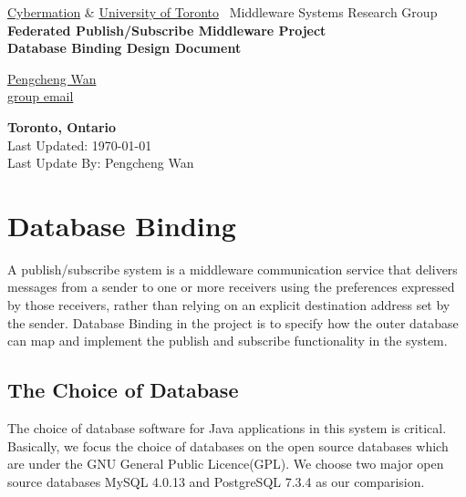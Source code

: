 \documentclass[11pt]{article}
\begin{document}
	
\pagestyle{plain}

\begin{titlepage}			%
\begin{center}

\vspace*{1in}
\Large
\textsf{\href{http://www.cybermation.com}{Cybermation} \& \href{http://www.ece.toronto.edu}{University of Toronto} \ Middleware Systems Research Group} \\
\vfill
\LARGE
\textsf{\textbf{Federated Publish/Subscribe Middleware Project}} \\
\bigskip
\huge
\textbf{Database Binding Design Document}

\vfill \vfill

\large

\href{mailto:wan_pengcheng@yahoo.com}{Pengcheng Wan} \\
\bigskip
\href{mailto:acheung@cybermation.com, e.fidler@utoronto.ca,
jacobsen@eecg.utoronto.ca, david.matheson@utoronto.ca,
smankovski@cybermation.com, pwan@cybermation.com}{group email}

\vfill

\textbf{Toronto, Ontario} \\
\bigskip
Last Updated: \today \\
Last Update By: Pengcheng Wan

\end{center}
\end{titlepage}				%

\normalsize
\newpage

\tableofcontents
\newpage

\setlength{\parindent}{0mm}
\setlength{\topsep}{0mm}
\setlength{\partopsep}{0mm}

\section{Database Binding}
A publish/subscribe system is a middleware communication service that delivers
messages from a sender to one or more receivers using the preferences expressed
by those receivers, rather than relying on an explicit destination address set
by the sender. Database Binding in the project is to specify how the outer database 
can map and implement the publish and subscribe functionality in the system.

\subsection{The Choice of Database}    %
The choice of database software for Java applications in this system is critical. Basically, we focus the choice of databases on the open source databases which are under the GNU General Public Licence(GPL). We choose two major open source databases MySQL 4.0.13 and PostgreSQL 7.3.4 as our comparision.
\end{document}
